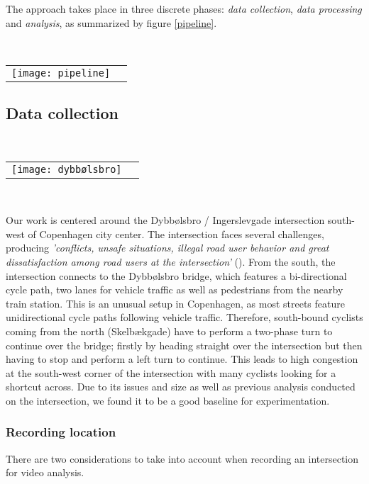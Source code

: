 The approach takes place in three discrete phases: \textit{data collection}, \textit{data processing} and \textit{analysis}, as summarized
by figure \ref{pipeline}.

\ \\ 
\raggedbottom
\begin{tabular}{@{}cc}
\texttt{[image: pipeline]} 
\end{tabular}
\label{pipeline}

\subsection{Data collection}
\ \\ 
\noindent
\begin{tabular}{@{}cc}
\texttt{[image: dybbølsbro]}
\end{tabular}
\label{intersection_overview}
\

Our work is centered around the Dybbølsbro / Ingerslevgade intersection south-west of Copenhagen
city center. The intersection faces several challenges, producing \textit{'conflicts, unsafe situations, illegal 
road user behavior and great dissatisfaction among road users at the intersection'} (\cite{CPHpost_2021}).
From the south, the intersection connects to the Dybbølsbro bridge, which features a bi-directional cycle path, two
lanes for vehicle traffic as well as pedestrians from the nearby train station. 
This is an unusual setup in Copenhagen, as most streets feature unidirectional cycle paths 
following vehicle traffic. Therefore, south-bound cyclists coming from the north (Skelbækgade) have to perform a two-phase 
turn to continue over the bridge; firstly by heading straight over the intersection but then having to stop and perform a left turn to 
continue. This leads to high congestion at the south-west corner of the intersection with many cyclists looking for a shortcut across. 
Due to its issues and size as well as previous analysis conducted on the intersection, we found it to be a good baseline for experimentation.

\subsubsection{Recording location}
There are two considerations to take into account when recording an intersection for video analysis.
\ \\

